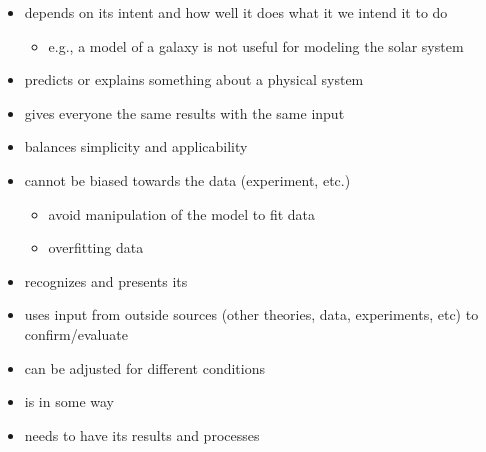 \documentclass[letterpaper,10pt,english]{jupyterBook}
\begin{document}
\sphinxAtStartPar
{}
\begin{itemize}
\item {} 
\sphinxAtStartPar
depends on its intent and how well it does what it we intend it to do
\begin{itemize}
\item {} 
\sphinxAtStartPar
e.g., a model of a galaxy is not useful for modeling the solar system

\end{itemize}

\item {} 
\sphinxAtStartPar
predicts or explains something about a physical system \sphinxhyphen{} 

\item {} 
\sphinxAtStartPar
gives everyone the same results with the same input \sphinxhyphen{} 

\item {} 
\sphinxAtStartPar
balances simplicity and applicability \sphinxhyphen{} 

\item {} 
\sphinxAtStartPar
cannot be biased towards the data (experiment, etc.)
\begin{itemize}
\item {} 
\sphinxAtStartPar
avoid manipulation of the model to fit data

\item {} 
\sphinxAtStartPar
overfitting data

\end{itemize}

\item {} 
\sphinxAtStartPar
recognizes  and presents its 

\item {} 
\sphinxAtStartPar
uses input from outside sources (other theories, data, experiments, etc) to confirm/evaluate \sphinxhyphen{} 

\item {} 
\sphinxAtStartPar
can be adjusted for different conditions \sphinxhyphen{} 

\item {} 
\sphinxAtStartPar
is  in some way

\item {} 
\sphinxAtStartPar
needs to have its results and processes 

\end{itemize}
\end{document}
